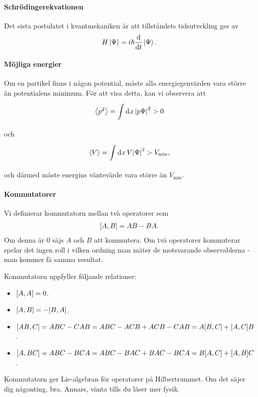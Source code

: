 \paragraph{Schrödingerekvationen}
Det sista postulatet i kvantmekaniken är att tillståndets tidsutvekling ges av
\begin{align*}
	H\ket{\Psi} = i\hbar\dv{t}\ket{\Psi}.
\end{align*}

\paragraph{Möjliga energier}
Om en partikel finns i någon potential, måste alla energiegenvärden vara större än potentialens minimum. För att visa detta, kan vi observera att
\begin{align*}
	\expval{p^{2}} = \int\limits_{}^{}\dd[]{x}\abs{p\Psi}^{2} > 0
\end{align*}
och
\begin{align*}
	\expval{V} = \int\limits_{}^{}\dd[]{x}V\abs{\Psi}^{2} > V_\text{min},
\end{align*}
och därmed måste energins väntevärde vara större än $V_\text{min}$.

\paragraph{Kommutatorer}
Vi definierar kommutatorn mellan två operatorer som
\begin{align*}
	[A, B] = AB - BA.
\end{align*}
Om denna är $0$ säjs $A$ och $B$ att kommutera. Om två operatorer kommuterar spelar det ingen roll i vilken ordning man mäter de motsvarande observablerna - man kommer få samma resultat.

Kommutatorn uppfyller följande relationer:
\begin{itemize}
	\item $[A, A] = 0$.
	\item $[A, B] = -[B, A]$.
	\item $[AB, C] = ABC - CAB = ABC - ACB + ACB - CAB = A[B, C] + [A, C]B$.
	\item $[A, BC] = ABC - BCA = ABC - BAC + BAC - BCA = B[A, C] + [A, B]C$.
\end{itemize}

Kommutatorn ger Lie-algebran för operatorer på Hilbertrummet. Om det säjer dig någonting, bra. Annars, vänta tills du läser mer fysik.

